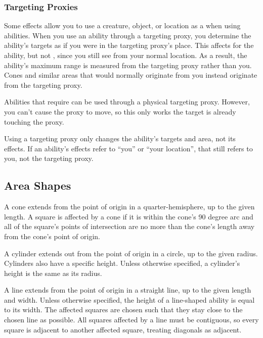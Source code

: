     \subsubsection{Targeting Proxies}\label{Targeting Proxies}
      Some effects allow you to use a creature, object, or location as a  when using abilities.
      When you use an ability through a targeting proxy, you determine the ability's targets as if you were in the targeting proxy's place.
      This affects  for the ability, but not , since you still see from your normal location.
      As a result, the ability's maximum range is measured from the targeting proxy rather than you.
      Cones and similar areas that would normally originate from you instead originate from the targeting proxy.

      Abilities that require  can be used through a physical targeting proxy.
      However, you can't cause the proxy to move, so this only works the target is already touching the proxy.

      Using a targeting proxy only changes the ability's targets and area, not its effects.
      If an ability's effects refer to ``you'' or ``your location'', that still refers to you, not the targeting proxy.

  \subsection{Area Shapes}\label{Area Shapes}

     A cone extends from the point of origin in a quarter-hemisphere, up to the given length.
    A square is affected by a cone if it is within the cone's 90 degree arc and all of the square's points of intersection are no more than the cone's length away from the cone's point of origin.

     A cylinder extends out from the point of origin in a circle, up to the given radius.
    Cylinders also have a specific height.
    Unless otherwise specified, a cylinder's height is the same as its radius.

     A line extends from the point of origin in a straight line, up to the given length and width.
    Unless otherwise specified, the height of a line-shaped ability is equal to its width.
    The affected squares are chosen such that they stay close to the chosen line as possible.
    All squares affected by a line must be contiguous, so every square is adjacent to another affected square, treating diagonals as adjacent.


